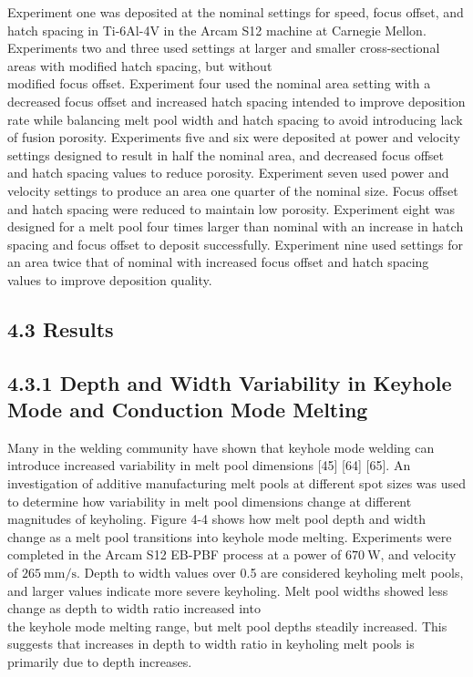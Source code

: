 \documentclass[10pt]{article}
\begin{document}
Experiment one was deposited at the nominal settings for speed, focus offset, and hatch spacing in Ti-6Al-4V in the Arcam S12 machine at Carnegie Mellon. Experiments two and three used settings at larger and smaller cross-sectional areas with modified hatch spacing, but without\\
modified focus offset. Experiment four used the nominal area setting with a decreased focus offset and increased hatch spacing intended to improve deposition rate while balancing melt pool width and hatch spacing to avoid introducing lack of fusion porosity. Experiments five and six were deposited at power and velocity settings designed to result in half the nominal area, and decreased focus offset and hatch spacing values to reduce porosity. Experiment seven used power and velocity settings to produce an area one quarter of the nominal size. Focus offset and hatch spacing were reduced to maintain low porosity. Experiment eight was designed for a melt pool four times larger than nominal with an increase in hatch spacing and focus offset to deposit successfully. Experiment nine used settings for an area twice that of nominal with increased focus offset and hatch spacing values to improve deposition quality.

\subsection*{4.3 Results}
\subsection*{4.3.1 Depth and Width Variability in Keyhole Mode and Conduction Mode Melting}
Many in the welding community have shown that keyhole mode welding can introduce increased variability in melt pool dimensions [45] [64] [65]. An investigation of additive manufacturing melt pools at different spot sizes was used to determine how variability in melt pool dimensions change at different magnitudes of keyholing. Figure 4-4 shows how melt pool depth and width change as a melt pool transitions into keyhole mode melting. Experiments were completed in the Arcam S12 EB-PBF process at a power of $670 \mathrm{~W}$, and velocity of $265 \mathrm{~mm} / \mathrm{s}$. Depth to width values over 0.5 are considered keyholing melt pools, and larger values indicate more severe keyholing. Melt pool widths showed less change as depth to width ratio increased into\\
the keyhole mode melting range, but melt pool depths steadily increased. This suggests that increases in depth to width ratio in keyholing melt pools is primarily due to depth increases.
\end{document}
